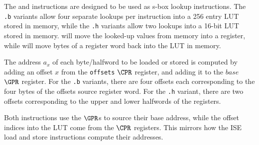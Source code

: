 

The  and  instructions are designed to be used as
s-box lookup instructions. The {\tt .b} variants allow four separate lookups
per instruction into a 256 entry LUT stored in memory, while the {\tt .h}
variants allow two lookups into a 16-bit LUT stored in memory. 
will move the looked-up values from memory into a register, while 
will move bytes of a register word back into the LUT in memory.

The address $a_x$ of each byte/halfword to be loaded or stored is computed by
adding an offset $x$ from the {\tt offsets} $\CPR$ register, and adding it
to the $base$ $\GPR$ register. For the {\tt .b} variants, there are four
offsets each corresponding to the four bytes of the offsets source register
word. For the {\tt .h} variant, there are two offsets corresponding to the
upper and lower halfwords of the registers.

Both instructions use the $\GPR$s to source their base address, while the
offset indices into the LUT come from the $\CPR$ registers. This mirrors
how the ISE load and store instructions compute their addresses.

\bigskip

